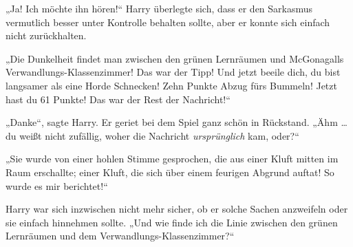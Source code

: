 „Ja! Ich möchte ihn hören!“ Harry überlegte sich, dass er den Sarkasmus vermutlich besser unter Kontrolle behalten sollte, aber er konnte sich einfach nicht zurückhalten.

„Die Dunkelheit findet man zwischen den grünen Lernräumen und McGonagalls Verwandlungs-Klassenzimmer! Das war der Tipp! Und jetzt beeile dich, du bist langsamer als eine Horde Schnecken! Zehn Punkte Abzug fürs Bummeln! Jetzt hast du 61 Punkte! Das war der Rest der Nachricht!“

„Danke“, sagte Harry. Er geriet bei dem Spiel ganz schön in Rückstand. „Ähm … du weißt nicht zufällig, woher die Nachricht \emph{ursprünglich} kam, oder?“

„Sie wurde von einer hohlen Stimme gesprochen, die aus einer Kluft mitten im Raum erschallte; einer Kluft, die sich über einem feurigen Abgrund auftat! So wurde es mir berichtet!“

Harry war sich inzwischen nicht mehr sicher, ob er solche Sachen anzweifeln oder sie einfach hinnehmen sollte.
„Und wie finde ich die Linie zwischen den grünen Lernräumen und dem Verwandlungs-Klassenzimmer?“

